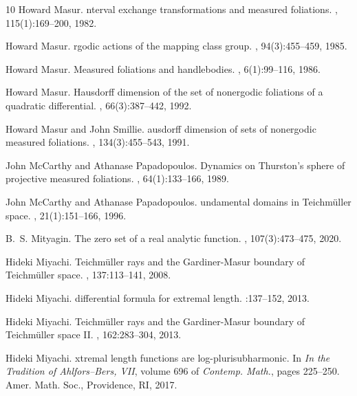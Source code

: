 \documentclass[dvipdfmx]{amsart}
\theoremstyle{remark}
\begin{document}
\begin{thebibliography}{10}
Howard Masur.
nterval exchange transformations and measured foliations.
, 115(1):169--200, 1982.

Howard Masur.
rgodic actions of the mapping class group.
, 94(3):455--459, 1985.

Howard Masur.
\newblock Measured foliations and handlebodies.
, 6(1):99--116, 1986.

Howard Masur.
\newblock Hausdorff dimension of the set of nonergodic foliations of a quadratic differential.
, 66(3):387--442, 1992.

Howard Masur and John Smillie.
ausdorff dimension of sets of nonergodic measured foliations.
, 134(3):455--543, 1991.

John McCarthy and Athanase Papadopoulos.
\newblock Dynamics on {T}hurston's sphere of projective measured foliations.
, 64(1):133--166, 1989.

John McCarthy and Athanase Papadopoulos.
undamental domains in {T}eichm{\"u}ller space.
, 21(1):151--166, 1996.

B.~S. Mityagin.
\newblock The zero set of a real analytic function.
, 107(3):473--475, 2020.

Hideki Miyachi.
\newblock Teichm{\"u}ller rays and the {G}ardiner-{M}asur boundary of {T}eichm{\"u}ller space.
, 137:113--141, 2008.

Hideki Miyachi.
 differential formula for extremal length.
:137--152, 2013.

Hideki Miyachi.
\newblock Teichm{\"u}ller rays and the {G}ardiner-{M}asur boundary of {T}eichm{\"u}ller space {II}.
, 162:283--304, 2013.

Hideki Miyachi.
xtremal length functions are log-plurisubharmonic.
\newblock In {\em In the Tradition of Ahlfors--Bers, VII}, volume 696 of {\em Contemp. Math.}, pages 225--250. Amer. Math. Soc., Providence, RI, 2017.


\end{thebibliography}
\end{document}
